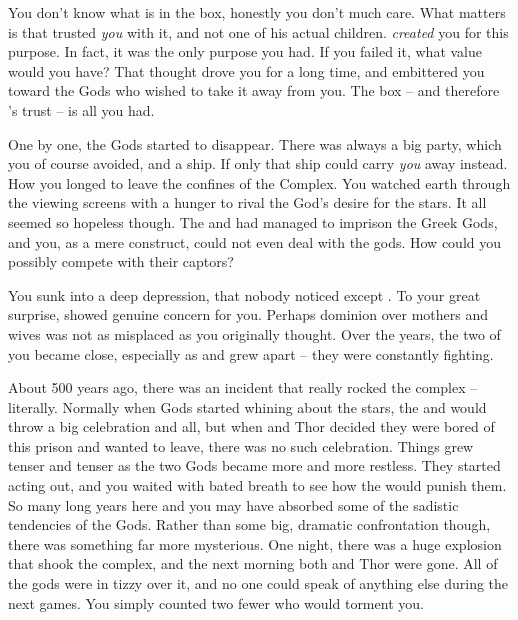 \documentclass[char]{guardians}
\begin{document}
You don't know what is in the box, honestly you don't much care. What matters is that \cZeus{} trusted \emph{you} with it, and not one of his actual children. \cZeus{\They} \emph{created} you for this purpose. In fact, it was the only purpose you had. If you failed it, what value would you have? That thought drove you for a long time, and embittered you toward the Gods who wished to take it away from you. The box -- and therefore \cZeus{}'s trust -- is all you had.

One by one, the Gods started to disappear. There was always a big party, which you of course avoided, and a ship. If only that ship could carry \emph{you} away instead. How you longed to leave the confines of the Complex. You watched earth through the viewing screens with a hunger to rival the God's desire for the stars. It all seemed so hopeless though.  The \cWarden{} and \cCaretaker{} had managed to imprison the Greek Gods, and you, as a mere construct, could not even deal with the gods. How could you possibly compete with their captors?

You sunk into a deep depression, that nobody noticed except \cHera{}. To your great surprise, \cHera{\they} showed genuine concern for you. Perhaps \cHera{\them} dominion over mothers and wives was not as misplaced as you originally thought. Over the years, the two of you became close, especially as \cHera{} and \cAthena{} grew apart -- they were constantly fighting.

About 500 years ago, there was an incident that really rocked the complex -- literally. Normally when Gods started whining about the stars, the \cWarden{} and \cCaretaker{} would throw a big celebration and all, but when \cSet{} and Thor decided they were bored of this prison and wanted to leave, there was no such celebration. Things grew tenser and tenser as the two Gods became more and more restless. They started acting out, and you waited with bated breath to see how the \cWarden{} would punish them. So many long years here and you may have absorbed some of the sadistic tendencies of the Gods.  Rather than some big, dramatic confrontation though, there was something far more mysterious. One night, there was a huge explosion that shook the complex, and the next morning both \cSet{} and Thor were gone. All of the gods were in tizzy over it, and no one could speak of anything else during the next games. You simply counted two fewer who would torment you.
\end{document}
